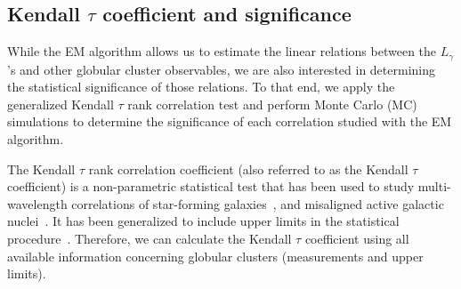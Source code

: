 \documentclass[doublespace,nopageskip]{VTthesis}
\begin{document}
\subsection{Kendall $\tau$ coefficient and significance}\label{sec:kendall}

While the EM algorithm allows us to estimate the linear relations between the $L_\gamma$'s and other globular cluster observables, we are also interested in determining the statistical significance of those relations. To that end, we apply the generalized Kendall $\tau$ rank correlation test and perform Monte Carlo (MC) simulations to determine the significance of each correlation studied with the EM algorithm. 

The Kendall $\tau$ rank correlation coefficient (also referred to as the Kendall $\tau$ coefficient) is a non-parametric statistical test that has been used to study multi-wavelength correlations of star-forming galaxies~\citep{2012ApJ...755..164A,2020ApJ...894...88A}, and misaligned active galactic nuclei~\citep{2014ApJ...780..161D}. It has been generalized to include upper limits in the statistical procedure~\citep{2012ApJ...755..164A}. Therefore, we can calculate the Kendall $\tau$ coefficient using all available information concerning globular clusters (measurements and upper limits).
\end{document}

